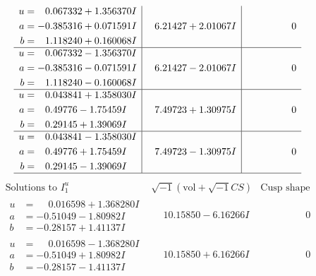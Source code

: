 \documentclass[1p]{elsarticle_modified}
\theoremstyle{definition}
\newcommand{\I}{\sqrt{-1}}
\begin{document}
$$\begin{array}{c|c|c}
\begin{aligned}
u &= \phantom{-}0.067332 + 1.356370 I \\
a &= -0.385316 + 0.071591 I \\
b &= \phantom{-}1.118240 + 0.160068 I\end{aligned}
 & \phantom{-}6.21427 + 2.01067 I & \phantom{-0.000000 } 0 \\ \hline\begin{aligned}
u &= \phantom{-}0.067332 - 1.356370 I \\
a &= -0.385316 - 0.071591 I \\
b &= \phantom{-}1.118240 - 0.160068 I\end{aligned}
 & \phantom{-}6.21427 - 2.01067 I & \phantom{-0.000000 } 0 \\ \hline\begin{aligned}
u &= \phantom{-}0.043841 + 1.358030 I \\
a &= \phantom{-}0.49776 - 1.75459 I \\
b &= \phantom{-}0.29145 + 1.39069 I\end{aligned}
 & \phantom{-}7.49723 + 1.30975 I & \phantom{-0.000000 } 0 \\ \hline\begin{aligned}
u &= \phantom{-}0.043841 - 1.358030 I \\
a &= \phantom{-}0.49776 + 1.75459 I \\
b &= \phantom{-}0.29145 - 1.39069 I\end{aligned}
 & \phantom{-}7.49723 - 1.30975 I & \phantom{-0.000000 } 0\\
 \hline 
 \end{array}$$\newpage$$\begin{array}{c|c|c}  
\text{Solutions to }I^u_{1}& \I (\text{vol} + \sqrt{-1}CS) & \text{Cusp shape}\\
 \hline 
\begin{aligned}
u &= \phantom{-}0.016598 + 1.368280 I \\
a &= -0.51049 - 1.80982 I \\
b &= -0.28157 + 1.41137 I\end{aligned}
 & \phantom{-}10.15850 - 6.16266 I & \phantom{-0.000000 } 0 \\ \hline\begin{aligned}
u &= \phantom{-}0.016598 - 1.368280 I \\
a &= -0.51049 + 1.80982 I \\
b &= -0.28157 - 1.41137 I\end{aligned}
 & \phantom{-}10.15850 + 6.16266 I & \phantom{-0.000000 } 0 \\ \hline\begin{aligned}

\end{aligned}
\end{array}$$
\end{document}
